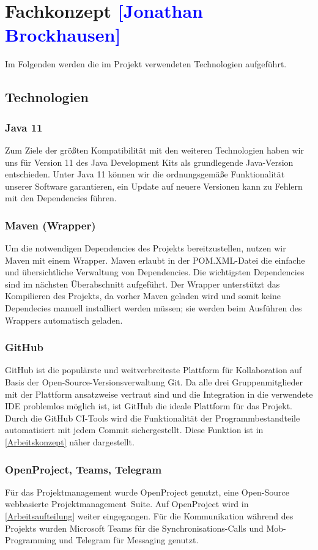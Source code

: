 

\section{Fachkonzept \textcolor{blue}{[Jonathan Brockhausen]}}
\label{Technologien}

Im Folgenden werden die im Projekt verwendeten Technologien aufgeführt.

\subsection{Technologien}

\subsubsection*{Java 11}
Zum Ziele der größten Kompatibilität mit den weiteren Technologien haben wir uns für Version 11 des Java Development Kits als grundlegende Java-Version entschieden. Unter Java 11 können wir die ordnungsgemäße Funktionalität unserer Software garantieren, ein Update auf neuere Versionen kann zu Fehlern mit den Dependencies führen.
\subsubsection*{Maven (Wrapper)}
Um die notwendigen Dependencies des Projekts bereitzustellen, nutzen wir Maven mit einem Wrapper. Maven erlaubt in der POM.XML-Datei die einfache und übersichtliche Verwaltung von Dependencies. Die wichtigsten Dependencies sind im nächsten Überabschnitt aufgeführt. Der Wrapper unterstützt das Kompilieren des Projekts, da vorher Maven geladen wird und somit keine Dependecies manuell installiert werden müssen; sie werden beim Ausführen des Wrappers automatisch geladen.
\subsubsection*{GitHub}
GitHub ist die populärste und weitverbreiteste Plattform für Kollaboration auf Basis der Open-Source-Versionsverwaltung Git. Da alle drei Gruppenmitglieder mit der Plattform ansatzweise vertraut sind und die Integration in die verwendete IDE problemlos möglich ist, ist GitHub die ideale Plattform für das Projekt. Durch die GitHub CI-Tools wird die Funktionalität der Programmbestandteile automatisiert mit jedem Commit sichergestellt. Diese Funktion ist in \cref{Arbeitskonzept} näher dargestellt.
\subsubsection*{OpenProject, Teams, Telegram}
Für das Projektmanagement wurde OpenProject genutzt, eine Open-Source webbasierte Projektmanagement~Suite. Auf OpenProject wird in \autoref{Arbeitsaufteilung} weiter eingegangen.
Für die Kommunikation während des Projekts wurden Microsoft Teams für die Synchronisations-Calls und Mob-Programming und Telegram für Messaging genutzt.

